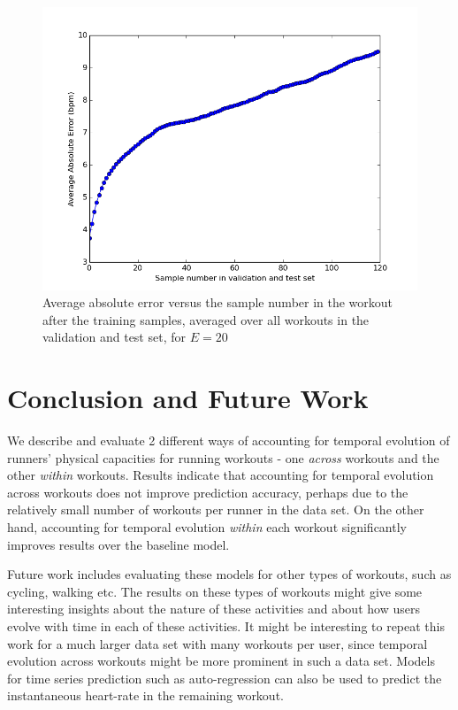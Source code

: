 \documentclass{acm_proc_article-sp}
\begin{document}
\begin{figure}[h]
\centering
\includegraphics[scale=0.4]{../src/plots/many_insthr_error_vs_sample_number}
\caption{\label{figManyInstHrErrorVsSampleNumberValTest} Average absolute error versus the sample number in the workout after the training samples, averaged over all workouts in the validation and test set, for $E = 20$}
\end{figure}

\section{Conclusion and Future Work}
\label{secConclusion}
We describe and evaluate 2 different ways of accounting for temporal evolution of runners' physical capacities for running workouts - one \emph{across} workouts and the other \emph{within} workouts. Results indicate that accounting for temporal evolution across workouts does not improve prediction accuracy, perhaps due to the relatively small number of workouts per runner in the data set. On the other hand, accounting for temporal evolution \emph{within} each workout significantly improves results over the baseline model.

Future work includes evaluating these models for other types of workouts, such as cycling, walking etc. The results on these types of workouts might give some interesting insights about the nature of these activities and about how users evolve with time in each of these activities. It might be interesting to repeat this work for a much larger data set with many workouts per user, since temporal evolution across workouts might be more prominent in such a data set. Models for time series prediction such as auto-regression \cite{autoRegressiveModelWiki} can also be used to predict the instantaneous heart-rate in the remaining workout.




\end{document}
